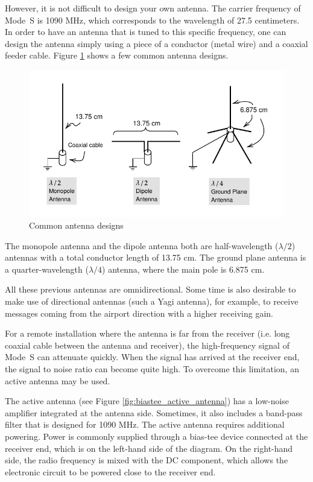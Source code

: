 However, it is not difficult to design your own antenna. The carrier frequency of Mode~S is 1090 MHz, which corresponds to the wavelength of 27.5 centimeters. In order to have an antenna that is tuned to this specific frequency, one can design the antenna simply using a piece of a conductor (metal wire) and a coaxial feeder cable. Figure \ref{fig:antennas} shows a few common antenna designs.

\begin{figure}[ht]
  \centering
  \includegraphics[scale=0.95]{figures/quickstart/antennas.pdf}
  \caption{Common antenna designs}
  \label{fig:antennas}
\end{figure}

The monopole antenna and the dipole antenna both are half-wavelength ($\lambda/2$) antennas with a total conductor length of 13.75 cm. The ground plane antenna is a quarter-wavelength ($\lambda/4$) antenna, where the main pole is 6.875 cm.

All these previous antennas are omnidirectional. Some time is also desirable to make use of directional antennas (such a Yagi antenna), for example, to receive messages coming from the airport direction with a higher receiving gain.

For a remote installation where the antenna is far from the receiver (i.e. long coaxial cable between the antenna and receiver), the high-frequency signal of Mode~S can attenuate quickly. When the signal has arrived at the receiver end, the signal to noise ratio can become quite high. To overcome this limitation, an active antenna may be used.

The active antenna (see Figure \ref{fig:biastee_active_antenna}) has a low-noise amplifier integrated at the antenna side. Sometimes, it also includes a band-pass filter that is designed for 1090 MHz. The active antenna requires additional powering. Power is commonly supplied through a bias-tee device connected at the receiver end, which is on the left-hand side of the diagram. On the right-hand side, the radio frequency is mixed with the DC component, which allows the electronic circuit to be powered close to the receiver end.

